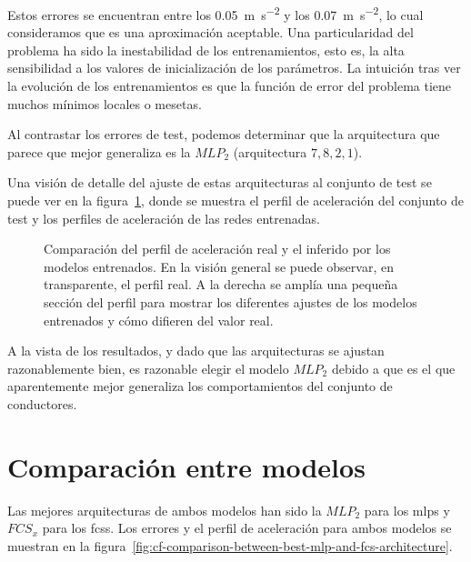 Estos errores se encuentran entre los \SI{0.05}{\metre\per\square\second} y los \SI{0.07}{\metre\per\square\second}, lo cual consideramos que es una aproximación aceptable. Una particularidad del problema ha sido la inestabilidad de los entrenamientos, esto es, la alta sensibilidad a los valores de inicialización de los parámetros. La intuición tras ver la evolución de los entrenamientos es que la función de error del problema tiene muchos mínimos locales o mesetas.

Al contrastar los errores de test, podemos determinar que la arquitectura que parece que mejor generaliza es la $MLP_2$ (arquitectura $7, 8, 2, 1$).

Una visión de detalle del ajuste de estas arquitecturas al conjunto de test se puede ver en la figura~\ref{fig:cf-mlp-test-comparisons}, donde se muestra el perfil de aceleración del conjunto de test y los perfiles de aceleración de las redes entrenadas.

\begin{figure}[t]
	\centering
	\qquad
	\caption[Comparación del perfil de aceleración real y el inferido por los modelos entrenados]{Comparación del perfil de aceleración real y el inferido por los modelos entrenados. En la visión general se puede observar, en transparente, el perfil real. A la derecha se amplía una pequeña sección del perfil para mostrar los diferentes ajustes de los modelos entrenados y cómo difieren del valor real.}
	\label{fig:cf-mlp-test-comparisons}
\end{figure}

A la vista de los resultados, y dado que las arquitecturas se ajustan razonablemente bien, es razonable elegir el modelo $MLP_2$ debido a que es el que aparentemente mejor generaliza los comportamientos del conjunto de conductores.

\section{Comparación entre modelos}

Las mejores arquitecturas de ambos modelos han sido la $MLP_2$ para los \acp{mlp} y $FCS_x$ para los \acp{fcs}. Los errores y el perfil de aceleración para ambos modelos se muestran en la figura~\ref{fig:cf-comparison-between-best-mlp-and-fcs-architecture}.

